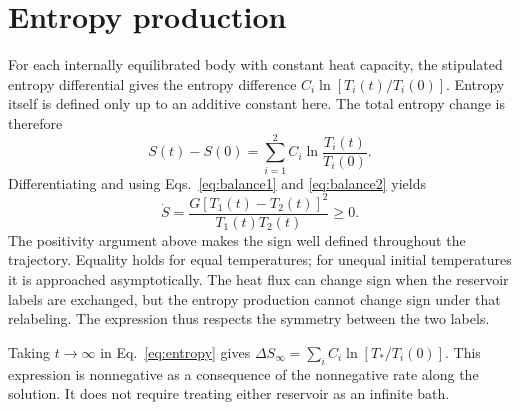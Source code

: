 \section{Entropy production}
For each internally equilibrated body with constant heat capacity, the stipulated entropy differential gives the entropy difference $C_i\ln[T_i(t)/T_i(0)]$. Entropy itself is defined only up to an additive constant here. The total entropy change is therefore
\begin{equation}
 S(t)-S(0)=\sum_{i=1}^{2} C_i\ln\frac{T_i(t)}{T_i(0)}.\label{eq:entropy}
\end{equation}
Differentiating and using Eqs.~\eqref{eq:balance1} and \eqref{eq:balance2} yields
\begin{equation}
 \dot S=\frac{G[T_1(t)-T_2(t)]^2}{T_1(t)T_2(t)}\geq0.\label{eq:srate}
\end{equation}
The positivity argument above makes the sign well defined throughout the trajectory. Equality holds for equal temperatures; for unequal initial temperatures it is approached asymptotically. The heat flux can change sign when the reservoir labels are exchanged, but the entropy production cannot change sign under that relabeling. The expression thus respects the symmetry between the two labels.

Taking $t\to\infty$ in Eq.~\eqref{eq:entropy} gives $\Delta S_\infty=\sum_i C_i\ln[T_*/T_i(0)]$. This expression is nonnegative as a consequence of the nonnegative rate along the solution. It does not require treating either reservoir as an infinite bath.
